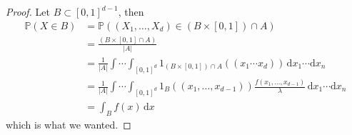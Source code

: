 \begin{proof}
    Let $B\subset [0,1]^{d-1}$, then
    \begin{align*}
        \mathbb P(X\in B)&=\mathbb P((X_1,\ldots,X_d)\in (B\times [0,1])\cap A)\\
        &=\frac{(B\times [0,1]\cap A)}{|A|}\\
        &=\frac{1}{|A|}\int\cdots\int_{[0,1]^d}1_{(B\times [0,1])\cap A}((x_1\cdots x_d))\,\mathrm dx_1\cdots\mathrm dx_n\\
        &=\frac{1}{|A|}\int\cdots\int_{[0,1]^d}1_{B}((x_1,\ldots ,x_{d-1}))\frac{f(x_1,\ldots,x_{d-1})}{\lambda}\,\mathrm dx_1\cdots\mathrm dx_n\\
        &=\int_Bf(x)\,\mathrm dx
    \end{align*}
    which is what we wanted.
\end{proof}